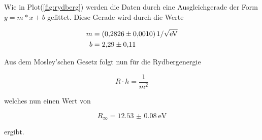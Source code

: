           \noindent Wie in Plot(\ref{fig:rydberg}) werden die Daten durch eine Ausgleichgerade der Form $y = m * x + b$ gefittet.
          Diese Gerade wird durch die Werte

          \begin{align*}
            m &= \SI{0.2826 \pm 0.0010}{1\per\sqrt{\electronvolt}}\\
            b &= \num{2.29 \pm 0.11}
          \end{align*}

          \noindent Aus dem Mosley'schen Gesetz folgt nun für die Rydbergenergie 

          \begin{equation*}
            R \cdot h = \frac{1}{m^2}
          \end{equation*}
          
          \noindent welches nun einen Wert von 

          \begin{equation*}
            R_{\infty} = \SI{12.53(8)}{\electronvolt}
          \end{equation*}

          \noindent ergibt.

            
            
          